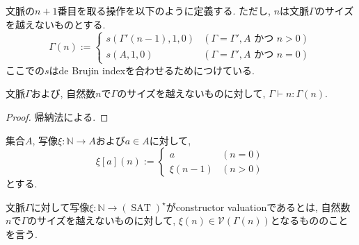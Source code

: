 \documentclass[12pt, titlepage]{ltjsarticle}
\DeclareMathOperator{\SAT}{SAT}
\begin{document}
\begin{defn}
 文脈の$n + 1$番目を取る操作を以下のように定義する. ただし, $n$は文脈$\Gamma$のサイズを越えないものとする.
\[
  \Gamma (n) := \begin{cases}
    s (\Gamma' (n - 1), 1, 0) & (\Gamma = \Gamma', A  \text{ かつ } n > 0) \\
    s(A, 1, 0) & (\Gamma = \Gamma', A  \text{ かつ } n = 0)
  \end{cases}
\]
ここでの$s$はde Brujin indexを合わせるためにつけている.
\end{defn}

\begin{lem}
 文脈$\Gamma$および, 自然数$n$で$\Gamma$のサイズを越えないものに対して, $\Gamma \vdash n \colon \Gamma (n)$.
\end{lem}
\begin{proof}
 帰納法による.
\end{proof}

\begin{defn}
集合$A$, 写像$\xi : \mathbb{N} \rightarrow A$および$a \in A$に対して,
 \[
   \xi[a](n) := \begin{cases}
    a & (n = 0) \\
    \xi(n - 1) & (n > 0)
  \end{cases}
 \]
とする.
\end{defn}

\begin{defn}
 文脈$\Gamma$に対して写像$\xi : \mathbb{N} \rightarrow (\SAT)^\star$がconstructor valuationであるとは, 自然数$n$で$\Gamma$のサイズを越えないものに対して, $\xi (n) \in \mathcal{V}(\Gamma(n))$となるもののことを言う.
\end{defn}
\end{document}
